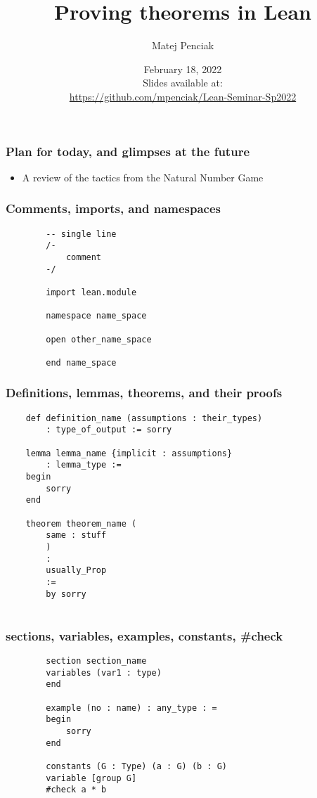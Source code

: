 \documentclass{beamer}
\title{Proving theorems in Lean}
\author{Matej Penciak}
\institute{Northeastern University}
\date{February 18, 2022 \\ Slides available at: \\ \url{https://github.com/mpenciak/Lean-Seminar-Sp2022}}
\begin{document}
\frame{\titlepage}

\begin{frame}[fragile]
    \frametitle{Plan for today, and glimpses at the future}

    \begin{itemize}
        \item A review of the tactics from the Natural Number Game
    \end{itemize}
\end{frame}

\begin{frame}[fragile]
    \frametitle{Comments, imports, and namespaces}

    \begin{lstlisting}
        -- single line
        /- 
            comment 
        -/

        import lean.module

        namespace name_space

        open other_name_space

        end name_space
    \end{lstlisting}

\end{frame}

\begin{frame}[fragile]
    \frametitle{Definitions, lemmas, theorems, and their proofs}

    \begin{lstlisting}
    def definition_name (assumptions : their_types) 
        : type_of_output := sorry

    lemma lemma_name {implicit : assumptions} 
        : lemma_type :=
    begin
        sorry
    end

    theorem theorem_name (
        same : stuff
        )
        : 
        usually_Prop
        := 
        by sorry
    
    \end{lstlisting}

\end{frame}

\begin{frame}[fragile]
    \frametitle{sections, variables, examples, constants, \#check}

    \begin{lstlisting}
        section section_name
        variables (var1 : type)
        end

        example (no : name) : any_type : = 
        begin
            sorry
        end

        constants (G : Type) (a : G) (b : G)
        variable [group G]
        #check a * b
    \end{lstlisting}

\end{frame}
\end{document}
